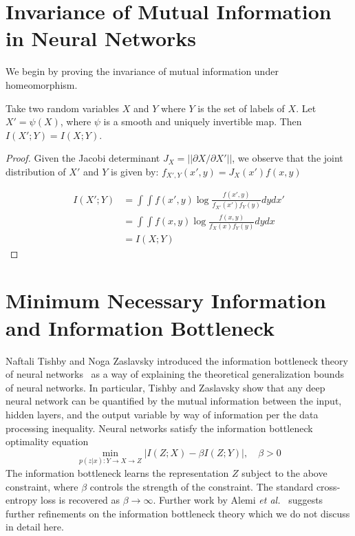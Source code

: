\section{Invariance of Mutual Information in Neural Networks}\label{invariance}

We begin by proving the invariance of mutual information under homeomorphism.

\begin{theorem}
Take two random variables $X$ and $Y$ where $Y$ is the set of labels of $X$.
Let $X' = \psi(X)$, where $\psi$ is a smooth and uniquely invertible map.
Then $I(X'; Y) = I(X; Y)$.
\end{theorem}

\begin{proof}
Given the Jacobi determinant $J_X = ||\partial X/ \partial X'||$, we observe that the joint distribution of $X'$ and $Y$ is given by: $f_{X', Y}(x', y) = J_X(x')f(x, y)$

\begin{align*}
I(X'; Y) & = \int \int f(x', y) \log \frac{f(x', y)}{f_{X'}(x') f_{Y}(y)} dy dx'\\
& = \int \int f(x, y) \log \frac{f(x, y)}{f_{X}(x) f_{Y}(y)} dy dx \\
& = I(X; Y)
\end{align*}
\end{proof}

\section{Minimum Necessary Information and Information Bottleneck}
Naftali Tishby and Noga Zaslavsky introduced the information bottleneck theory of neural networks~\cite{tishby2015deep} as a way of explaining the theoretical generalization bounds of neural networks.
In particular, Tishby and Zaslavsky show that any deep neural network can be quantified by the mutual information between the input, hidden layers, and the output variable by way of information per the data processing inequality.
Neural networks satisfy the information bottleneck optimality equation
$$\min_{p(z|x):Y \to X \to Z} |I(Z;X) - \beta I(Z; Y)| , \quad\beta > 0$$
The information bottleneck learns the representation $Z$ subject to the above constraint, where $\beta$ controls the strength of the constraint.
The standard cross-entropy loss is recovered as $\beta \to \infty$. 
Further work by Alemi \textit{et al.}~\cite{alemi2016deep} suggests further refinements on the information bottleneck theory which we do not discuss in detail here. 

